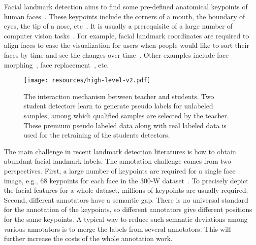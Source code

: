 \documentclass[10pt,twocolumn,letterpaper]{article}
\begin{document}
Facial landmark detection aims to find some pre-defined anatomical keypoints of human faces~\cite{xiong2013supervised,lv2017deep,xiao2017recurrent,tang2018quantized}.
These keypoints include the corners of a mouth, the boundary of eyes, the tip of a nose, {etc}~\cite{shen2015first,sagonas2013300,koestinger2011annotated}.
It is usually a prerequisite of a large number of computer vision tasks~\cite{liu2018exploring,thies2016face2face,blanz2003face}.
For example, facial landmark coordinates are required to align faces to ease the visualization for users when people would like to sort their faces by time and see the changes over time~\cite{dong2018san}.
Other examples include face morphing~\cite{blanz2003face}, face replacement~\cite{thies2016face2face}, etc.



\begin{figure}[!t]
\center\label{fig:high-level}
\texttt{[image: resources/high-level-v2.pdf]}
\caption{
The interaction mechanism between teacher and students. 
Two student detectors learn to generate pseudo labels for unlabeled samples, among which qualified samples are selected by the teacher. These premium pseudo labeled data along with real labeled data is used for the retraining of the students detectors.
}
\end{figure}


The main challenge in recent landmark detection literatures is how to obtain abundant facial landmark labels.
The annotation challenge comes from two perspectives.
First, a large number of keypoints are required for a single face image, e.g., 68 keypoints for each face in the 300-W dataset~\cite{sagonas2013300}.
To precisely depict the facial features for a whole dataset, millions of keypoints are usually required. 
Second, different annotators have a semantic gap.
There is no universal standard for the annotation of the keypoints, so different annotators give different positions for the same keypoints.
A typical way to reduce such semantic deviations among various annotators is to merge the labels from several annotators.
This will further increase the costs of the whole annotation work.
\end{document}
